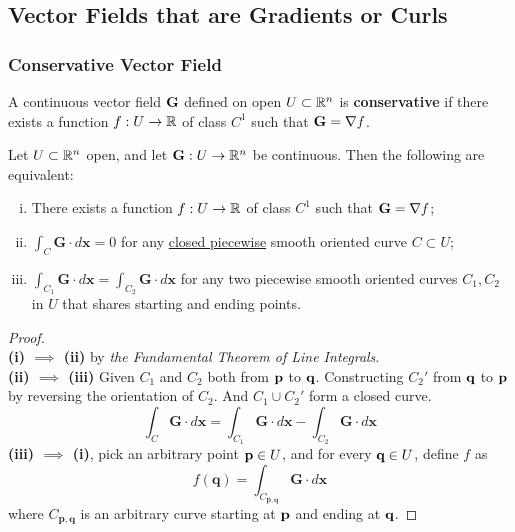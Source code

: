 \documentclass[11pt]{article}
\newcommand{\veG}[0]{\ve{G}}
\begin{document}
		\subsection{Vector Fields that are Gradients or Curls}
			\subsubsection{Conservative Vector Field}
			\begin{definition}
				A continuous vector field $\veG$ defined on open $U \subset \mathbb{R}^n$ is \textbf{conservative} if there exists a function $f: U \to \mathbb{R}$ of class $C^1$ such that $\veG = \nabla f$.
			\end{definition}
		
			\begin{theorem}
				Let $U \subset \mathbb{R}^n$ open, and let $\veG: U \to \R^n$ be continuous. Then the following are equivalent:
				\begin{enumerate}[(i)]
					\item There exists a function $f: U \to \mathbb{R}$ of class $C^1$ such that $\veG = \nabla f$;
					\item $\int_{C} \mathbf{G} \cdot d \mathbf{x}=0$ for any \ul{closed piecewise} smooth oriented curve $C \subset U$;
					\item $\int_{C_{1}} \mathbf{G} \cdot d \mathbf{x}=\int_{C_{2}} \mathbf{G} \cdot d \mathbf{x}$ for any two piecewise smooth oriented curves $C_1, C_2$ in $U$ that shares starting and ending points.
				\end{enumerate}
				\begin{proof}
					\quad \\
					\textbf{(i) $\implies$ (ii)} by \emph{the Fundamental Theorem of Line Integrals}.\\
					\textbf{(ii) $\implies$ (iii)} Given $C_1$ and $C_2$ both from $\textbf{p}$ to $\textbf{q}$. Constructing $C_2'$ from $\textbf{q}$ to $\textbf{p}$ by reversing the orientation of $C_2$. And $C_1 \cup C_2'$ form a closed curve.
					\begin{equation}
						\int_{C} \mathbf{G} \cdot d \mathbf{x}=\int_{C_{1}} \mathbf{G} \cdot d \mathbf{x}-\int_{C_{2}} \mathbf{G} \cdot d \mathbf{x}
					\end{equation}
					\textbf{(iii) $\implies$ (i)}, pick an arbitrary point $\textbf{p} \in U$, and for every $\textbf{q} \in U$, define $f$ as 
					\begin{equation}
						f(\mathbf{q})=\int_{C_{\mathbf{p}, \mathbf{q}}} \mathbf{G} \cdot d \mathbf{x}
					\end{equation}
					where $C_{\mathbf{p}, \mathbf{q}}$ is an arbitrary curve starting at $\textbf{p}$ and ending at $\textbf{q}$.
				\end{proof}
			\end{theorem}
			
\end{document}
